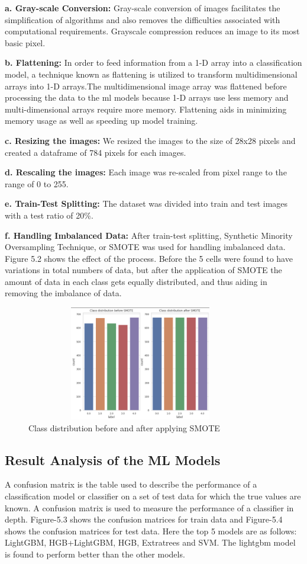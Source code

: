 \textbf{a. Gray-scale Conversion: }
Gray-scale conversion of images facilitates the simplification of algorithms and also removes the difficulties associated with computational requirements. Grayscale compression reduces an image to its most basic pixel.\

\textbf{b. Flattening: }
In order to feed information from a 1-D array into a classification model, a technique known as flattening is utilized to transform multidimensional arrays into 1-D arrays.The multidimensional image array was flattened before processing the data to the ml models because 1-D arrays use less memory and  multi-dimensional arrays require more memory. Flattening aids in minimizing memory usage as well as speeding up model training.\

\textbf{c. Resizing the images: }
We resized the images to the size of 28x28 pixels and created a dataframe of 784 pixels for each images. \

\textbf{d. Rescaling the images: }
Each image was re-scaled from pixel range to the range of 0 to 255. \

\textbf{e. Train-Test Splitting: }
The dataset was divided into train and test images with a test ratio of 20\%. \

\textbf{f. Handling Imbalanced Data: }
After train-test splitting, Synthetic Minority Oversampling Technique, or SMOTE was used for handling imbalanced data. Figure 5.2 shows the effect of the process. Before the 5 cells were found to have variations in total numbers of data, but after the application of SMOTE the amount of data in each class gets equally distributed, and thus aiding in removing the imbalance of data. 

\begin{figure}[H]
\centering
\includegraphics[width=100mm,height=50mm]{figures/smote.png}
\caption{Class distribution before and after applying SMOTE}
\label{DLAccuracy}
\end{figure}

\subsection{Result Analysis of the ML Models}
A confusion matrix is the table used to describe the performance of a classification model or classifier on a set of test data for which the true values are known. A confusion matrix is used to measure the performance of a classifier in depth. Figure-5.3 shows the confusion matrices for train data and Figure-5.4 shows the confusion matrices for test data. Here the top 5 models are as follows: LightGBM, HGB+LightGBM, HGB, Extratrees and SVM. The lightgbm model is found to perform better than the other models.

